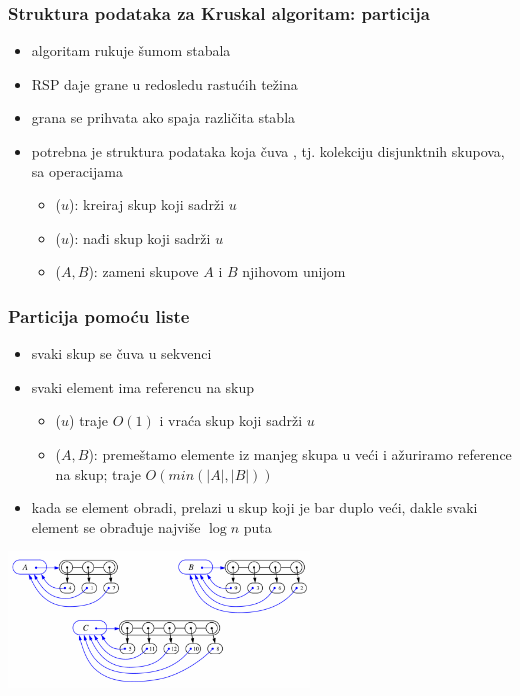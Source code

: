 \documentclass[compress]{beamer}
\begin{document}
\begin{frame}[fragile]
  \frametitle{Struktura podataka za Kruskal algoritam: particija}
  \begin{itemize}
    \item algoritam rukuje šumom stabala
    \item RSP daje grane u redosledu rastućih težina
    \item grana se prihvata ako spaja različita stabla
    \item potrebna je struktura podataka koja čuva ,
      tj. kolekciju disjunktnih skupova, sa operacijama
    \begin{itemize}
      \item {}($u$): kreiraj skup koji sadrži $u$
      \item {}($u$): nađi skup koji sadrži $u$
      \item {}($A,B$): zameni skupove $A$ i $B$ njihovom 
        unijom
    \end{itemize}
  \end{itemize}
\end{frame}

\begin{frame}[fragile]
  \frametitle{Particija pomoću liste}
  \begin{itemize}
    \item svaki skup se čuva u sekvenci
    \item svaki element ima referencu na skup
    \begin{itemize}
      \item {}($u$) traje $O(1)$ i vraća skup koji sadrži $u$
      \item {}($A,B$): premeštamo elemente iz manjeg skupa u
        veći i ažuriramo reference na skup; traje $O(min(|A|,|B|))$
    \end{itemize}
    \item kada se element obradi, prelazi u skup koji je bar duplo veći,
      dakle svaki element se obrađuje najviše $\log n$ puta
  \end{itemize}
  \begin{center}
    \includegraphics[width=8cm]{asp-14-pic77.png}
  \end{center}
\end{frame}
\end{document}
